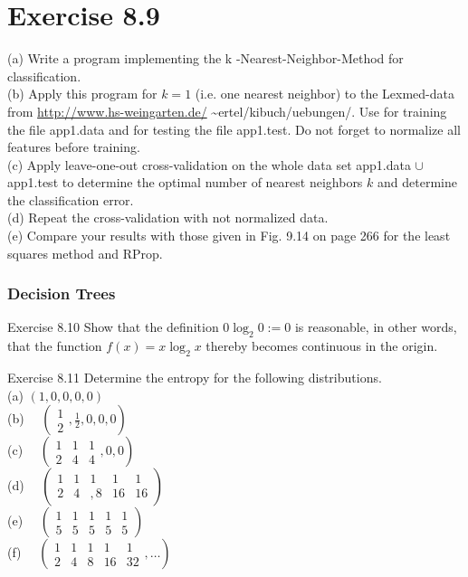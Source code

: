 \documentclass[10pt]{article}
\begin{document}
\section*{Exercise 8.9}
(a) Write a program implementing the k -Nearest-Neighbor-Method for classification.\\
(b) Apply this program for $k=1$ (i.e. one nearest neighbor) to the Lexmed-data from \href{http://www.hs-weingarten.de/}{http://www.hs-weingarten.de/} \~{}ertel/kibuch/uebungen/. Use for training the file app1.data and for testing the file app1.test. Do not forget to normalize all features before training.\\
(c) Apply leave-one-out cross-validation on the whole data set app1.data $\cup$ app1.test to determine the optimal number of nearest neighbors $k$ and determine the classification error.\\
(d) Repeat the cross-validation with not normalized data.\\
(e) Compare your results with those given in Fig. 9.14 on page 266 for the least squares method and RProp.

\subsubsection*{Decision Trees}
Exercise 8.10 Show that the definition $0 \log _{2} 0:=0$ is reasonable, in other words, that the function $f(x)=x \log _{2} x$ thereby becomes continuous in the origin.

Exercise 8.11 Determine the entropy for the following distributions.\\
(a) $(1,0,0,0,0)$\\
(b) $\quad\left(\begin{array}{l}1 \\ 2\end{array}, \frac{1}{2}, 0,0,0\right)$\\
(c) $\quad\left(\begin{array}{ccc}1 & 1 & 1 \\ 2 & 4 & 4\end{array}, 0,0\right)$\\
(d) $\quad\left(\begin{array}{ccccc}1 & 1 & 1 & 1 & 1 \\ 2 & 4 & , 8 & 16 & 16\end{array}\right)$\\
(e) $\quad\left(\begin{array}{ccccc}1 & 1 & 1 & 1 & 1 \\ 5 & 5 & 5 & 5 & 5\end{array}\right)$\\
(f) $\quad\left(\begin{array}{ccccc}1 & 1 & 1 & 1 & 1 \\ 2 & 4 & 8 & 16 & 32\end{array}, \ldots\right)$
\end{document}
